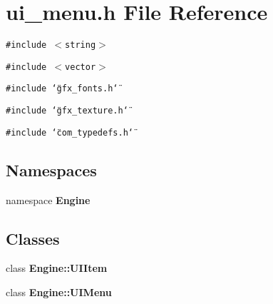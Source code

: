 \section{ui\_\-menu.h File Reference}
\label{ui__menu_8h}
{\tt \#include $<$string$>$}\par
{\tt \#include $<$vector$>$}\par
{\tt \#include \char`\"{}gfx\_\-fonts.h\char`\"{}}\par
{\tt \#include \char`\"{}gfx\_\-texture.h\char`\"{}}\par
{\tt \#include \char`\"{}com\_\-typedefs.h\char`\"{}}\par
\subsection*{Namespaces}
\begin{CompactItemize}
\item 
namespace {\bf Engine}
\end{CompactItemize}
\subsection*{Classes}
\begin{CompactItemize}
\item 
class {\bf Engine::UIItem}
\item 
class {\bf Engine::UIMenu}
\end{CompactItemize}
